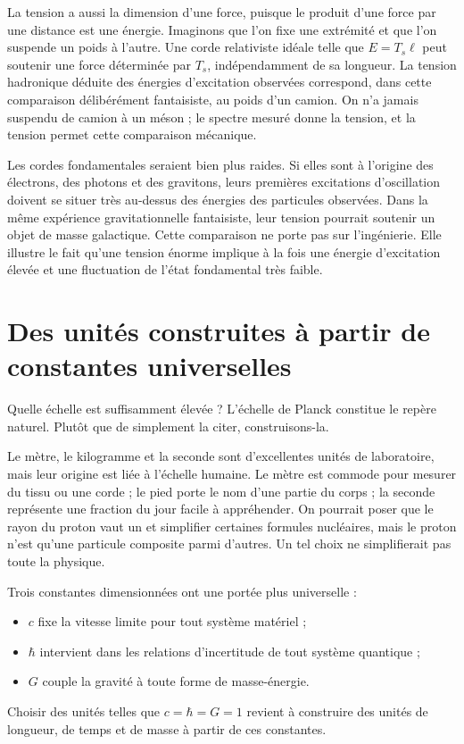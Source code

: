 La tension a aussi la dimension d’une force, puisque le produit d’une
force par une distance est une énergie. Imaginons que l’on fixe une
extrémité et que l’on suspende un poids à l’autre. Une corde relativiste
idéale telle que \(E=T_s\ell\) peut soutenir une force déterminée par \(T_s\),
indépendamment de sa longueur. La tension hadronique déduite des énergies
d’excitation observées correspond, dans cette comparaison délibérément
fantaisiste, au poids d’un camion. On n’a jamais suspendu de camion à un
méson ; le spectre mesuré donne la tension, et la tension permet cette
comparaison mécanique.

Les cordes fondamentales seraient bien plus raides. Si elles sont à
l’origine des électrons, des photons et des gravitons, leurs premières
excitations d’oscillation doivent se situer très au-dessus des énergies des
particules observées. Dans la même expérience gravitationnelle fantaisiste,
leur tension pourrait soutenir un objet de masse galactique. Cette
comparaison ne porte pas sur l’ingénierie. Elle illustre le fait qu’une
tension énorme implique à la fois une énergie d’excitation élevée et une
fluctuation de l’état fondamental très faible.

\section{Des unités construites à partir de constantes universelles}

Quelle échelle est suffisamment élevée ? L’échelle de Planck constitue le
repère naturel. Plutôt que de simplement la citer, construisons-la.

Le mètre, le kilogramme et la seconde sont d’excellentes unités de
laboratoire, mais leur origine est liée à l’échelle humaine. Le mètre est
commode pour mesurer du tissu ou une corde ; le pied porte le nom d’une
partie du corps ; la seconde représente une fraction du jour facile à
appréhender. On pourrait poser que le rayon du proton vaut un et simplifier
certaines formules nucléaires, mais le proton n’est qu’une particule
composite parmi d’autres. Un tel choix ne simplifierait pas toute la physique.

Trois constantes dimensionnées ont une portée plus universelle :
\begin{itemize}
  \item \(c\) fixe la vitesse limite pour tout système matériel ;
  \item \(\hbar\) intervient dans les relations d’incertitude de tout système
  quantique ;
  \item \(G\) couple la gravité à toute forme de masse-énergie.
\end{itemize}
Choisir des unités telles que \(c=\hbar=G=1\) revient à construire des unités
de longueur, de temps et de masse à partir de ces constantes.

